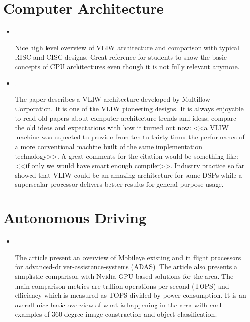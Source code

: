 \section*{Computer Architecture}
\begin{itemize}
    \item \cite{Philips:VLIW:1997}:

    Nice high level overview of VLIW architecture and comparison with typical RISC and CISC designs. Great reference for students to show the basic concepts of CPU architectures even though it is not fully relevant anymore.

    \item \cite{Colwell:Multiflow-VLIW:1987}:

    The paper describes a VLIW architecture developed by Multiflow Corporation. It is one of the VLIW pioneering designs. It is always enjoyable to read old papers about computer architecture trends and ideas; compare the old ideas and expectations with how it turned out now: <<a VLIW machine was expected to provide from ten to thirty times the performance of a more conventional machine built of the same implementation technology>>. A great comments for the citation would be something like: <<if only we would have smart enough compiler>>. Industry practice so far showed that VLIW could be an amazing architecture for some DSPs while a superscalar processor delivers better results for general purpose usage.
\end{itemize}

\section*{Autonomous Driving}
\begin{itemize}
    \item \cite{Delmer:Mobileye:2019}:

    The article present an overview of Mobileye existing and in flight processors for advanced-driver-assistance-systems (ADAS). The article also presents a simplistic comparison with Nvidia GPU-based solutions for the area. The main comparison metrics are trillion operations per second (TOPS) and efficiency which is measured as TOPS divided by power consumption. It is an overall nice basic overview of what is happening in the area with cool examples of 360-degree image construction and object classification.
\end{itemize}

